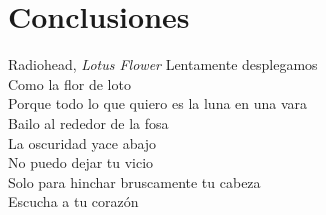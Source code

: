 \chapter{Conclusiones}

\begin{chapquote}{Radiohead, \textit{Lotus Flower}}
\noindent Lentamente desplegamos\\
Como la flor de loto\\
Porque todo lo que quiero es la luna en una vara\\
Bailo al rededor de la fosa\\
La oscuridad yace abajo\\
No puedo dejar tu vicio\\
Solo para hinchar bruscamente tu cabeza\\
Escucha a tu corazón
\end{chapquote}

\lipsum[1-2]